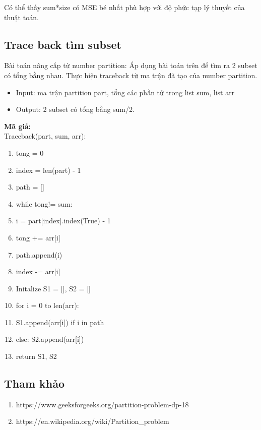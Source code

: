 \documentclass[12pt, letterpaper]{article}
\begin{document}
Có thể thấy sum*size có MSE bé nhất phù hợp với độ phức tạp lý thuyết của thuật toán.
\subsection{Trace back tìm subset}
Bài toán nâng cấp từ number partition: Áp dụng bài toán trên để tìm ra 2 subset có tổng bằng nhau. Thực hiện traceback từ ma trận đã tạo của number partition.
\begin{itemize}
    \item Input: ma trận partition part, tổng các phần tử trong list sum, list arr
    \item Output: 2 subset có tổng bằng sum/2.
\end{itemize}
\textbf{Mã giả:}\\
Traceback(part, sum, arr):
\begin{enumerate}
    \item tong = 0 
    \item index = len(part) - 1
    \item path = []
    \item \setlength{\itemindent}{40pt} while tong!= sum:
    \item i = part[index].index(True) - 1
    \item tong += arr[i]
    \item path.append(i)
    \item index -= arr[i]
    \item \noindent Initalize S1 = [], S2 = []
    \item \noindent for i = 0 to len(arr):
    \item S1.append(arr[i]) if i in path
    \item else: S2.append(arr[i])
    \item \noindent return S1, S2
\end{enumerate}
\subsection{Tham khảo}
\begin{enumerate}
    \item https://www.geeksforgeeks.org/partition-problem-dp-18
    \item https://en.wikipedia.org/wiki/Partition\_problem
\end{enumerate}
\end{document}
